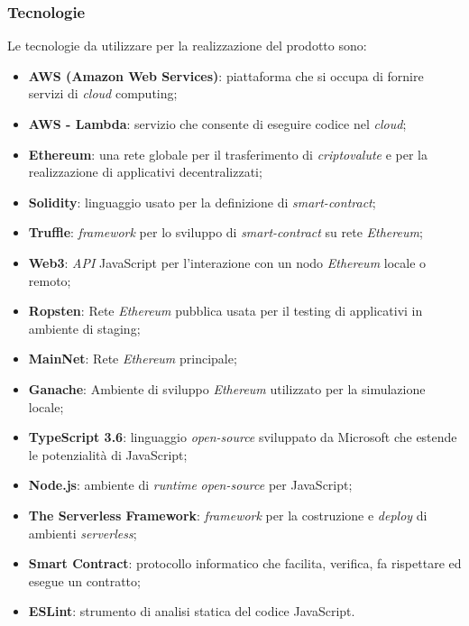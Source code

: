 \subsubsection{Tecnologie}
Le tecnologie da utilizzare per la realizzazione del prodotto sono:
\begin{itemize}
	\item \textbf{AWS (Amazon Web Services)}: piattaforma che si occupa di fornire servizi di \textit{cloud\glo} computing;
	\item \textbf{AWS - Lambda}: servizio che consente di eseguire codice nel \textit{cloud\glos};
	\item \textbf{Ethereum}: una rete globale per il trasferimento di \textit{criptovalute\glo} e per la realizzazione di applicativi decentralizzati;
	\item \textbf{Solidity}: linguaggio usato per la definizione di \textit{smart-contract\glos};
	\item \textbf{Truffle}: \textit{framework\glo} per lo sviluppo di \textit{smart-contract\glo} su rete \textit{Ethereum\glos};
	\item \textbf{Web3}: \textit{API\glo} JavaScript per l'interazione con un nodo \textit{Ethereum\glo} locale o remoto;
	\item \textbf{Ropsten}: Rete \textit{Ethereum\glo} pubblica usata per il testing di applicativi in ambiente di staging;
	\item \textbf{MainNet}: Rete \textit{Ethereum\glo} principale;
	\item \textbf{Ganache}: Ambiente di sviluppo \textit{Ethereum\glo} utilizzato per la simulazione locale;
	\item \textbf{TypeScript 3.6}:  linguaggio \textit{open-source\glo} sviluppato da Microsoft che estende le potenzialità di JavaScript;
	\item \textbf{Node.js}: ambiente di \textit{runtime\glo} \textit{open-source\glo} per JavaScript;
	\item \textbf{The Serverless Framework}: \textit{framework\glo} per la costruzione e \textit{deploy\glo}  di ambienti \textit{serverless\glos};
	\item \textbf{Smart Contract}: protocollo informatico che facilita, verifica, fa rispettare ed esegue un contratto;
	\item \textbf{ESLint}: strumento di analisi statica del codice JavaScript.
\end{itemize}
